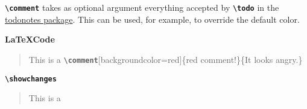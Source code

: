 \documentclass[10pt]{article}
\newcommand{\writecommand}[1]{\texttt{\textbf{{\textbackslash#1}}}}
\newcommand{\writearg}[1]{\{#1\}}
\begin{document}
\writecommand{comment} takes as optional argument everything accepted by \writecommand{todo} in the \href{https://ctan.org/pkg/todonotes?lang=en}{todonotes package}. This can be used, for example, to override the default color.
~\newline

\textbf{\LaTeX Code}

\begin{quote}
    This is a \writecommand{comment}[backgroundcolor=red]\writearg{red comment!}\writearg{It looks angry.}
\end{quote}

\writecommand{showchanges}
\showchanges

\begin{quote}
This is a 
\end{quote}
\end{document}
